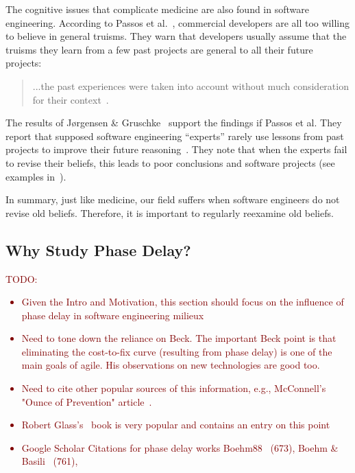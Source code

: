 \documentclass{sig-alternate}
\newcommand{\todo}[1]{\textcolor{Maroon}{TODO: #1}}
\begin{document}
The cognitive issues that complicate medicine are also found in software engineering.
According to Passos et al.~\cite{passos11}, commercial developers
are all too willing to believe in general
truisms.
They  warn that developers
usually assume that the truisms they learn from a few past
projects are general to 
all their future projects:
\begin{quote}\label{q:pass}
...the past experiences were taken into account without 
much consideration for their context~\cite{passos11}.  
\end{quote}
The results of J{\o}rgensen \& Gruschke~\cite{jorgensen09} support the findings if Passos et al. They report that 
  supposed software engineering    ``experts'' rarely use lessons
  from past projects to improve their future reasoning~\cite{jorgensen09}. 
 They note that
when the experts
  fail to revise their beliefs, this leads to poor
 conclusions and software projects  (see examples in~\cite{jorgensen09}).

In summary, just like medicine, our field suffers when
 software engineers do  not revise old beliefs.  Therefore, it is important
 to regularly  reexamine    old beliefs.
 
\subsection{Why Study Phase Delay?}
\todo{\begin{itemize}
\item Given the Intro and Motivation, this section should focus on the influence of phase delay in software engineering milieux
\item Need to tone down the reliance on Beck. The important Beck point is that eliminating the cost-to-fix curve (resulting from phase delay) is one of the main goals of agile. His observations on new technologies are good too.
\item Need to cite other popular sources of this information, e.g., McConnell's "Ounce of Prevention" article~\cite{mcconnell01}.
\item Robert Glass's~\cite{glass02} book is very popular and contains an entry on this point
\item Google Scholar Citations for phase delay works Boehm88~\cite{boehm88} (673), Boehm \& Basili~\cite{boehm01} (761), 
\end{itemize}}
\end{document}
